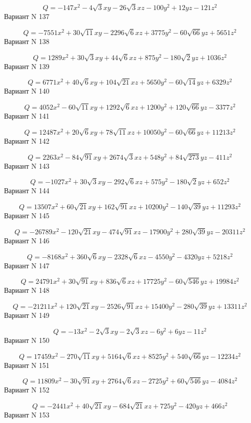 \documentclass[11pt]{report}
\begin{document}
$$Q = - 147 x^{2} - 4 \sqrt{3} x y - 26 \sqrt{3} x z - 100 y^{2} + 12 y z - 121 z^{2}$$Вариант N 137

$$Q = - 7551 x^{2} + 30 \sqrt{11} x y - 2296 \sqrt{6} x z + 3775 y^{2} - 60 \sqrt{66} y z + 5651 z^{2}$$Вариант N 138

$$Q = 1289 x^{2} + 30 \sqrt{3} x y + 44 \sqrt{6} x z + 875 y^{2} - 180 \sqrt{2} y z + 1036 z^{2}$$Вариант N 139

$$Q = 6771 x^{2} + 40 \sqrt{6} x y + 104 \sqrt{21} x z + 5650 y^{2} - 60 \sqrt{14} y z + 6329 z^{2}$$Вариант N 140

$$Q = 4052 x^{2} - 60 \sqrt{11} x y + 1292 \sqrt{6} x z + 1200 y^{2} + 120 \sqrt{66} y z - 3377 z^{2}$$Вариант N 141

$$Q = 12487 x^{2} + 20 \sqrt{6} x y + 78 \sqrt{11} x z + 10050 y^{2} - 60 \sqrt{66} y z + 11213 z^{2}$$Вариант N 142

$$Q = 2263 x^{2} - 84 \sqrt{91} x y + 2674 \sqrt{3} x z + 548 y^{2} + 84 \sqrt{273} y z - 411 z^{2}$$Вариант N 143

$$Q = - 1027 x^{2} + 30 \sqrt{3} x y - 292 \sqrt{6} x z + 575 y^{2} - 180 \sqrt{2} y z + 652 z^{2}$$Вариант N 144

$$Q = 13507 x^{2} + 60 \sqrt{21} x y + 162 \sqrt{91} x z + 10200 y^{2} - 140 \sqrt{39} y z + 11293 z^{2}$$Вариант N 145

$$Q = - 26789 x^{2} - 120 \sqrt{21} x y - 474 \sqrt{91} x z - 17900 y^{2} + 280 \sqrt{39} y z - 20311 z^{2}$$Вариант N 146

$$Q = - 8168 x^{2} + 360 \sqrt{6} x y - 2328 \sqrt{6} x z - 4550 y^{2} - 4320 y z + 5218 z^{2}$$Вариант N 147

$$Q = 24791 x^{2} + 30 \sqrt{91} x y + 836 \sqrt{6} x z + 17725 y^{2} - 60 \sqrt{546} y z + 19984 z^{2}$$Вариант N 148

$$Q = - 21211 x^{2} + 120 \sqrt{21} x y - 2526 \sqrt{91} x z + 15400 y^{2} - 280 \sqrt{39} y z + 13311 z^{2}$$Вариант N 149

$$Q = - 13 x^{2} - 2 \sqrt{3} x y - 2 \sqrt{3} x z - 6 y^{2} + 6 y z - 11 z^{2}$$Вариант N 150

$$Q = 17459 x^{2} - 270 \sqrt{11} x y + 5164 \sqrt{6} x z + 8525 y^{2} + 540 \sqrt{66} y z - 12234 z^{2}$$Вариант N 151

$$Q = 11809 x^{2} - 30 \sqrt{91} x y + 2764 \sqrt{6} x z - 2725 y^{2} + 60 \sqrt{546} y z - 4084 z^{2}$$Вариант N 152

$$Q = - 2441 x^{2} + 40 \sqrt{21} x y - 684 \sqrt{21} x z + 725 y^{2} - 420 y z + 466 z^{2}$$Вариант N 153
\end{document}
